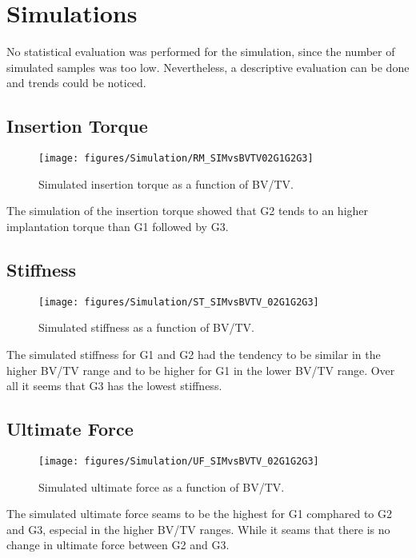 \documentclass[12pt, a4paper, twoside]{report}
\begin{document}
\section{Simulations}
%
No statistical evaluation was performed for the simulation, since the number of simulated samples was too low. Nevertheless, a descriptive evaluation can be done and trends could be noticed. \\
%
\begin{figure}[H]
\centering 
{}
\label{fig:UF_simvsexp}
\end{figure}
%
\subsection{Insertion Torque}
%
\begin{figure}[H]
  \centering
      \texttt{[image: figures/Simulation/RM\_SIMvsBVTV02G1G2G3]}
  \caption{Simulated insertion torque as a function of BV/TV.}
  \label{fig:RM_sim}
\end{figure}
%
The simulation of the insertion torque showed that G2 tends to an higher implantation torque than G1 followed by G3. 
%
\subsection{Stiffness}
%
\begin{figure}[H]
  \centering
      \texttt{[image: figures/Simulation/ST\_SIMvsBVTV\_02G1G2G3]}
  \caption{Simulated stiffness as a function of BV/TV.}
  \label{fig:sigma_sim}
\end{figure}
%
The simulated stiffness for G1 and G2 had the tendency to be similar in the higher BV/TV range and to be higher for G1 in the lower BV/TV range. Over all it seems that G3 has the lowest stiffness.
%
\subsection{Ultimate Force}
%
\begin{figure}[H]
  \centering
      \texttt{[image: figures/Simulation/UF\_SIMvsBVTV\_02G1G2G3]}
  \caption{Simulated ultimate force as a function of BV/TV.}
  \label{fig:UF_sim}
\end{figure}
%
The simulated ultimate force seams to be the highest for G1 comphared to G2 and G3, especial in the higher BV/TV ranges. While it seams that there is no change in ultimate force between G2 and G3.
%
%
%
\end{document}
